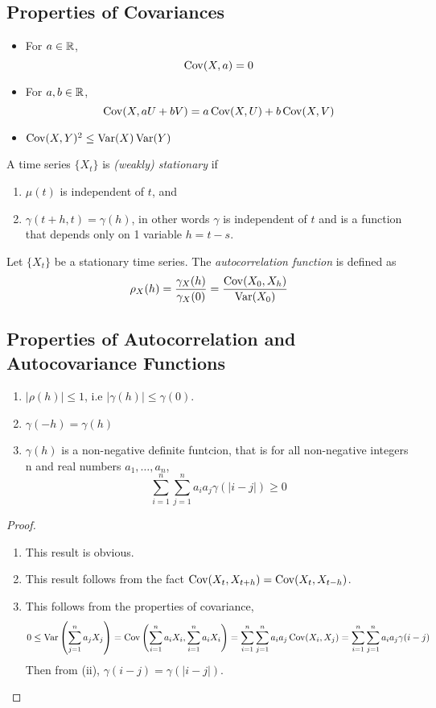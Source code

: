 \subsection{Properties of Covariances}
\begin{itemize}
    \item For $a \in \mathbb{R}$, 
    \[\operatorname{Cov}(X,a) = 0\]
    \item For $a,b\in \mathbb{R}$,
    \[\operatorname{Cov}(X, aU + bV) = a\operatorname{Cov}(X,U) + b\operatorname{Cov}(X,V)\]
    \item $\operatorname{Cov}(X,Y)^2 \leq \operatorname{Var}(X)\operatorname{Var}(Y)$
\end{itemize}


\begin{definition}
    A time series $\{X_t\}$ is \emph{(weakly) stationary} if 
    \begin{enumerate}
        \item $\mu(t)$ is independent of $t$, and
        \item $\gamma(t+h,t) = \gamma(h)$, in other words $\gamma$ is independent of $t$ and is a function that depends only on 1 variable $h = t-s$.
    \end{enumerate}
\end{definition}

\begin{definition}
    Let $\{X_t\}$ be a stationary time series. The \emph{autocorrelation function} is defined as 
    \[\rho_X(h) = \frac{\gamma_X(h)}{\gamma_X(0)} = \frac{\operatorname{Cov}(X_0, X_h)}{\operatorname{Var}(X_0)}\]
\end{definition}

\subsection{Properties of Autocorrelation and Autocovariance Functions}

\begin{enumerate}[label=(\roman*)]
    \item $|\rho(h)| \leq 1$, i.e $|\gamma(h)| \leq \gamma(0)$.
    \item $\gamma(-h) = \gamma(h)$
    \item $\gamma(h)$ is a non-negative definite funtcion, that is for all non-negative integers n and real numbers $a_1,\ldots,a_n$,
    \[\sum_{i=1}^n\sum_{j=1}^n a_ia_j\gamma(|i-j|) \geq 0\]
\end{enumerate}

\begin{proof}
    \begin{enumerate}[label=(\roman*)]
        \item This result is obvious. 
        \item This result follows from the fact $\operatorname{Cov}(X_t, X_{t+h}) = \operatorname{Cov}(X_t, X_{t-h})$.
        \item This follows from the properties of covariance, 
        \[0 \leq \operatorname{Var}\left(\sum_{j=1}^na_jX_j\right) = \operatorname{Cov}\left(\sum_{i=1}^n a_iX_i, \sum_{i=1}^n a_iX_i\right) = \sum_{i=1}^n\sum_{j=1}^na_ia_j\operatorname{Cov}(X_i,X_j) = \sum_{i=1}^n\sum_{j=1}^n a_ia_j\gamma(i-j)\]
        Then from (ii), $\gamma(i-j) = \gamma(|i-j|)$.
    \end{enumerate}
\end{proof}

